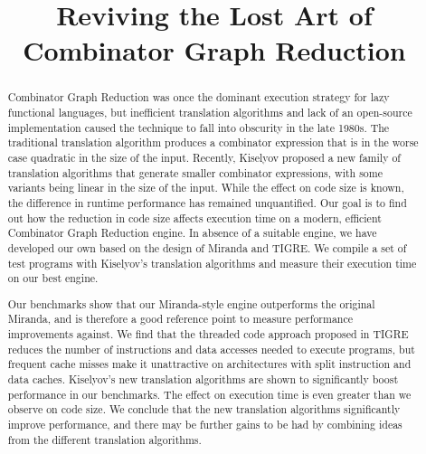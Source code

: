 \documentclass[conference]{IEEEtran}
\begin{document}
\title{Reviving the Lost Art of \\Combinator Graph Reduction}

\author{
}

\maketitle

\begin{abstract}
    Combinator Graph Reduction was once the dominant execution strategy for lazy functional languages, but inefficient translation algorithms and lack of an open-source implementation caused the technique to fall into obscurity in the late 1980s.
    The traditional translation algorithm produces a combinator expression that is in the worse case quadratic in the size of the input.
    Recently, Kiselyov proposed a new family of translation algorithms that generate smaller combinator expressions, with some variants being linear in the size of the input.
    While the effect on code size is known, the difference in runtime performance has remained unquantified.
    Our goal is to find out how the reduction in code size affects execution time on a modern, efficient Combinator Graph Reduction engine.
    In absence of a suitable engine, we have developed our own based on the design of Miranda and TIGRE.
    We compile a set of test programs with Kiselyov's translation algorithms and measure their execution time on our best engine.

    Our benchmarks show that our Miranda-style engine outperforms the original Miranda, and is therefore a good reference point to measure performance improvements against.
    We find that the threaded code approach proposed in TIGRE reduces the number of instructions and data accesses needed to execute programs, but frequent cache misses make it unattractive on architectures with split instruction and data caches.
    Kiselyov's new translation algorithms are shown to significantly boost performance in our benchmarks.
    The effect on execution time is even greater than we observe on code size.
    We conclude that the new translation algorithms significantly improve performance, and there may be further gains to be had by combining ideas from the different translation algorithms.


\end{abstract}
\end{document}
